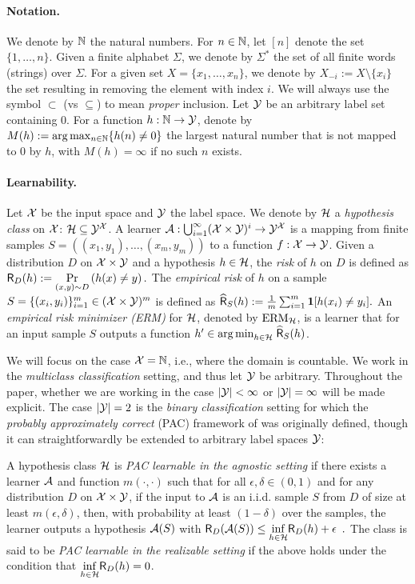 \documentclass[11pt]{article}
\begin{document}
\paragraph{Notation.}
We denote by $\mathbb{N}$ the natural numbers.
For $n\in\mathbb{N}$, let $[n]$ denote the set $\{1,\dots, n\}$.
Given a finite alphabet $\Sigma$, we denote by $\Sigma^*$ the set of all finite words (strings) over $\Sigma$.
For a given set $X=\{x_1,\dots,x_n\}$, we denote by $X_{-i}:=X\setminus\{x_i\}$ the set resulting in removing the element with index $i$.
We will always use the symbol $\subset$ (vs $\subseteq$) to mean \emph{proper} inclusion.
Let $\mathcal{Y}$ be an arbitrary label set containing $0$. 
For a function $h:\mathbb{N}\rightarrow\mathcal{Y}$, denote by  $M(h):=\arg\max_{n\in\mathbb{N}}\{ h(n)\neq0 \}$ the largest natural number that is not mapped to 0 by $h$, with $M(h)=\infty$ if no such $n$ exists.


\paragraph{Learnability.}
Let $\mathcal{X}$ be the input space and $\mathcal{Y}$ the label space. 
We denote by $\mathcal{H}$ a \emph{hypothesis class} on $\mathcal{X}$: $\mathcal{H}\subseteq\mathcal{Y}^{\mathcal{X}}$.  A learner $\mathcal{A}: \bigcup_{i=1}^{\infty}(\mathcal{X}\times\mathcal{Y})^i \to \mathcal{Y}^{\mathcal{X}}$ is a mapping from finite samples $S=((x_1,y_1),\dots,(x_m,y_m))$ to a function $f:\mathcal{X} \to \mathcal{Y}$. 
Given a distribution $D$ on $\mathcal{X}\times\mathcal{Y}$ and a hypothesis $h\in\mathcal{H}$, the \emph{risk} of $h$ on $D$ is defined as $\mathsf{R}_D(h):=\underset{{(x,y)\sim D}}{\Pr}\left(h(x)\neq y\right).$
The \emph{empirical risk} of $h$ on a sample $S=\{(x_i,y_i)\}_{i=1}^m\in(\mathcal{X}\times \mathcal{Y})^m$ is defined as 
$\widehat{\mathsf{R}}_S(h):=\frac{1}{m}\sum_{i=1}^m\mathbf{1}[h(x_i)\neq y_i].$
An \emph{empirical risk minimizer (ERM)} for $\mathcal{H}$,  denoted by $\mathrm{ERM}_{\mathcal{H}}$, is a learner that for an input sample $S$ outputs a function $h'\in{\arg\min}_{h\in\mathcal{H}}\;\widehat{\mathsf{R}}_S(h)$.  

We will focus on the case $\mathcal{X}=\mathbb{N}$, i.e., where the domain is countable.
We work in the \emph{multiclass classification} setting, and thus let $\mathcal{Y}$ be arbitrary.
Throughout the paper, whether we are working in the case $|\mathcal{Y}|<\infty$ or $|\mathcal{Y}|=\infty$ will be made explicit.
The case $|\mathcal{Y}|=2$ is the \emph{binary classification} setting for which the \emph{probably approximately correct} (PAC) framework of \cite{valiant1984theory} was originally defined, though it can straightforwardly be extended to arbitrary label spaces $\mathcal{Y}$:

\begin{definition} 
    A hypothesis class $\mathcal{H}$ is \emph{PAC learnable in the agnostic setting} if there exists a learner $\mathcal{A}$ and function $m(\cdot,\cdot)$ such that for all $\epsilon,\delta\in(0,1)$ and  for any distribution $D$ on $\mathcal{X}\times\mathcal{Y}$, if the input to $\mathcal{A}$ is an i.i.d. sample $S$ from $D$ of size at least $m(\epsilon,\delta)$, then, with probability at least $(1-\delta)$ over the samples, the learner outputs a hypothesis $\mathcal{A}(S)$ with 
    $\mathsf{R}_D(\mathcal{A}(S))\leq \underset{h\in\mathcal{H}}{\inf}\mathsf{R}_D(h)+\epsilon\enspace.$
    The class is said to be \emph{PAC learnable in the realizable setting} if the above holds under the condition that $\underset{h\in\mathcal{H}}{\inf}\mathsf{R}_D(h)=0$.
\end{definition}
\end{document}
